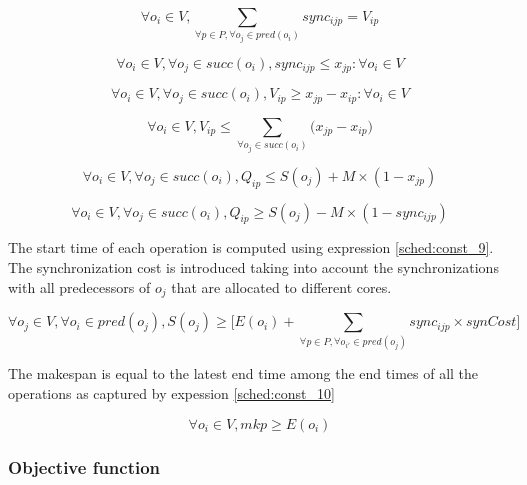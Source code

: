 \begin{equation}
\forall o_i \in V, \sum_{\forall p \in P, \forall o_j \in pred(o_i)}sync_{ijp}= V_{ip}
\label{sched:const_3}
\end{equation}

\begin{equation}
\forall o_i \in V, \forall o_j \in succ(o_i), sync_{ijp} \leq x_{jp}: \forall o_i \in V
\label{sched:const_4}
\end{equation}

\begin{equation}
\forall o_i \in V, \forall o_j \in succ(o_i), V_{ip} \geq x_{jp} - x_{ip}: \forall o_i \in V
\label{sched:const_5}
\end{equation}

\begin{equation}
 \forall o_i \in V, V_{ip} \leq \sum_{\forall o_j \in succ(o_i)}\big(x_{jp} - x_{ip}\big)
\label{sched:const_6}
\end{equation}

\begin{equation}
\forall o_i \in V, \forall o_j \in succ(o_i), Q_{ip} \leq S(o_j) + M \times (1-x_{jp})
\label{sched:const_7}
\end{equation}

\begin{equation}
\forall o_i \in V, \forall o_j \in succ(o_i), Q_{ip} \geq S(o_j) - M \times (1-sync_{ijp})
\label{sched:const_8}
\end{equation}

The start time of each operation is computed using expression \ref{sched:const_9}. The synchronization cost is introduced taking into account the synchronizations with all predecessors of $o_j$ that are allocated to different cores. 

\begin{equation}
\forall o_j \in V, \forall o_i \in pred(o_j), S(o_j) \geq \Big[E(o_i) + \sum_{\forall p \in P, \forall o_{i'} \in pred(o_j)}sync_{ijp}\times synCost\Big]
\label{sched:const_9}
\end{equation}

The makespan is equal to the latest end time among the end times of all the operations as captured by expession \ref{sched:const_10}

\begin{equation}
\forall o_i \in V, mkp \geq E(o_i) 
\label{sched:const_10}
\end{equation}

\subsubsection{Objective function}

